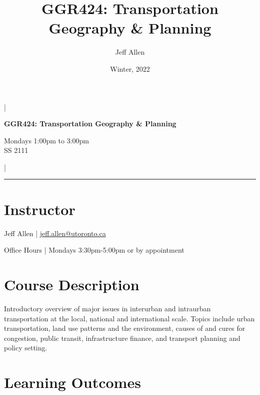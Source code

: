 \documentclass[11pt]{article}
\title{\textbf{GGR424: Transportation Geography \& Planning}}
\author{Jeff Allen}
\date{Winter, 2022}
\begin{document}
	\allsectionsfont{\sffamily}
	
	
	\begin{center}
		
		|
		
		\Large{\textsf{\textbf{GGR424: Transportation Geography \& Planning}}}
		
		\normalsize
		
		Mondays 1:00pm to 3:00pm 
		\\
		SS 2111		
		
				
		|
		
		\vspace{5 mm}
		
		\hrule
		
	\end{center}
		

	
	
	
	\vspace{3 mm}
	
	
	\section*{\textsf{Instructor}}
	
	Jeff Allen | \url{jeff.allen@utoronto.ca}
	
	Office Hours | Mondays 3:30pm-5:00pm or by appointment
	
	\section*{Course Description}
	
	Introductory overview of major issues in interurban and intraurban transportation at the local, national and international scale. Topics include urban transportation, land use patterns and the environment, causes of and cures for congestion, public transit, infrastructure finance, and transport planning and policy setting. 
	
	
	\section*{Learning Outcomes}
	
\end{document}
